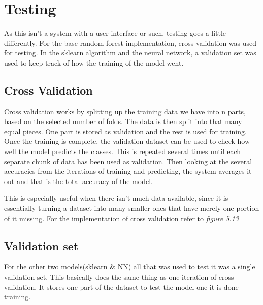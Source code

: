 \section{Testing}
As this isn't a system with a user interface or such, testing goes a little differently. For the base random forest implementation, cross validation was used for testing. In the sklearn algorithm and the neural network, a validation set was used to keep track of how the training of the model went. 

\subsection{Cross Validation}
Cross validation works by splitting up the training data we have into n parts, based on the selected number of folds. The data is then split into that many equal pieces. One part is stored as validation and the rest is used for training. Once the training is complete, the validation dataset can be used to check how well the model predicts the classes. This is repeated several times until each separate chunk of data has been used as validation. Then looking at the several accuracies from the iterations of training and predicting, the system averages it out and that is the total accuracy of the model. 

This is especially useful when there isn't much data available, since it is essentially turning a dataset into many smaller ones that have merely one portion of it missing. For the implementation of cross validation refer to \textit{figure 5.13}

\subsection{Validation set}
For the other two models(sklearn \& NN) all that was used to test it was a single validation set. This basically does the same thing as one iteration of cross validation. It stores one part of the dataset to test the model one it is done training. 










